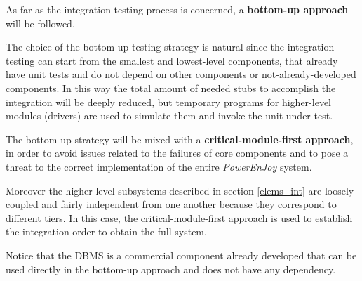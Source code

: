 As far as the integration testing process is concerned, a \textbf{bottom-up approach} will be followed. 

The choice of the bottom-up testing strategy is natural since the integration testing can start from the smallest and lowest-level components, that already have unit tests and do not depend on other components or not-already-developed components. In this way the total amount of needed stubs to accomplish the integration will be deeply reduced, but temporary programs for higher-level modules (drivers) are used to simulate them and invoke the unit under test.

The bottom-up strategy will be mixed with a \textbf{critical-module-first approach}, in order to avoid issues related to the failures of core components and to pose a threat to the correct implementation of the entire \emph{PowerEnJoy} system.

Moreover the higher-level subsystems described in section \ref{elems_int} are loosely coupled and fairly independent from one another because they correspond to different tiers. In this case, the critical-module-first approach is used to establish the integration order to obtain the full system.

Notice that the DBMS is a commercial component already developed that can be used directly in the bottom-up approach and does not have any dependency.
